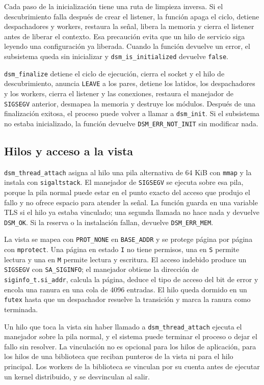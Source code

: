 Cada paso de la inicialización tiene una ruta de limpieza inversa. Si el descubrimiento falla después de crear el listener, la función apaga el ciclo, detiene despachadores y workers, restaura la señal, libera la memoria y cierra el listener antes de liberar el contexto. Esa precaución evita que un hilo de servicio siga leyendo una configuración ya liberada. Cuando la función devuelve un error, el subsistema queda sin inicializar y \texttt{dsm\_is\_initialized} devuelve \texttt{false}.

\texttt{dsm\_finalize} detiene el ciclo de ejecución, cierra el socket y el hilo de descubrimiento, anuncia \texttt{LEAVE} a los pares, detiene los latidos, los despachadores y los workers, cierra el listener y las conexiones, restaura el manejador de \texttt{SIGSEGV} anterior, desmapea la memoria y destruye los módulos. Después de una finalización exitosa, el proceso puede volver a llamar a \texttt{dsm\_init}. Si el subsistema no estaba inicializado, la función devuelve \texttt{DSM\_ERR\_NOT\_INIT} sin modificar nada.

\subsection{Hilos y acceso a la vista}

\texttt{dsm\_thread\_attach} asigna al hilo una pila alternativa de 64 KiB con \texttt{mmap} y la instala con \texttt{sigaltstack}. El manejador de \texttt{SIGSEGV} se ejecuta sobre esa pila, porque la pila normal puede estar en el punto exacto del acceso que produjo el fallo y no ofrece espacio para atender la señal. La función guarda en una variable TLS si el hilo ya estaba vinculado; una segunda llamada no hace nada y devuelve \texttt{DSM\_OK}. Si la reserva o la instalación fallan, devuelve \texttt{DSM\_ERR\_MEM}.

La vista se mapea con \texttt{PROT\_NONE} en \texttt{BASE\_ADDR} y se protege página por página con \texttt{mprotect}. Una página en estado \texttt{I} no tiene permisos, una en \texttt{S} permite lectura y una en \texttt{M} permite lectura y escritura. El acceso indebido produce un \texttt{SIGSEGV} con \texttt{SA\_SIGINFO}; el manejador obtiene la dirección de \texttt{siginfo\_t.si\_addr}, calcula la página, deduce el tipo de acceso del bit de error y encola una ranura en una cola de 4096 entradas. El hilo queda dormido en un \texttt{futex} hasta que un despachador resuelve la transición y marca la ranura como terminada.

Un hilo que toca la vista sin haber llamado a \texttt{dsm\_thread\_attach} ejecuta el manejador sobre la pila normal, y el sistema puede terminar el proceso o dejar el fallo sin resolver. La vinculación no es opcional para los hilos de aplicación, para los hilos de una biblioteca que reciban punteros de la vista ni para el hilo principal. Los workers de la biblioteca se vinculan por su cuenta antes de ejecutar un kernel distribuido, y se desvinculan al salir.

